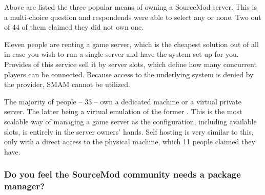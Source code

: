\begin{figure}[H]
  \centering
\end{figure}

Above are listed the three popular means of owning a SourceMod server.
This is a multi-choice question and respondends were able to select any or none.
Two out of 44 of them claimed they did not own one.

Eleven people are renting a game server, which is the cheapest solution out of all in case you wish to run a single server and have the system set up for you.
Provides of this service sell it by server slots, which define how many concurrent players can be connected.
Because access to the underlying system is denied by the provider, SMAM cannot be utilized.

The majority of people -- 33 -- own a dedicated machine or a virtual private server.
The latter being a virtual emulation of the former \cite{vps-explained}.
This is the most scalable way of managing a game server as the configuration, including available slots, is entirely in the server owners' hands.
Self hosting is very similar to this, only with a direct access to the physical machine, which 11 people claimed they have.

\subsubsection{Do you feel the SourceMod community needs a package manager?}

\begin{figure}[H]
  \centering
\end{figure}

